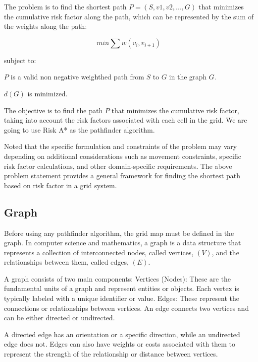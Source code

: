 \documentclass[12pt]{report}
\begin{document}
        The problem is to find the shortest path \(P = (S, v1, v2, . . . , G)\) that minimizes the cumulative risk
        factor along the path, which can be represented by the sum of the weights along the path:

        \begin{equation}\label{eq:weighted_graph}
            min \sum w(v_i,v_{i+1})
        \end{equation}

        subject to:
        \begin{myitemize}
            \item \(P\) is a valid non negative weighthed path from \(S\) to \(G\) in the graph \(G\).
            \item \(d(G)\) is minimized.           
        \end{myitemize}
        The objective is to find the path \(P\) that minimizes the cumulative risk factor, taking into account the risk
        factors associated with each cell in the grid. We are going to use Risk A* as the pathfinder algorithm.
            
            
        Noted that the specific formulation and constraints of the problem may vary depending on additional
        considerations such as movement constraints, specific risk factor calculations, and other domain-specific
        requirements. The above problem statement provides a general framework for finding the shortest path based on
        risk factor in a grid system.

        \subsection{Graph}
        Before using any pathfinder algorithm, the grid map must be defined in the graph. In computer science and
        mathematics, a graph is a data structure that represents a collection of interconnected nodes, called vertices,
        \((V)\), and the relationships between them, called edges, \((E)\).
            
        A graph consists of two main components: Vertices (Nodes): These are the fundamental units of a graph and
        represent entities or objects. Each vertex is typically labeled with a unique identifier or value. Edges: These
        represent the connections or relationships between vertices. An edge connects two vertices and can be either
        directed or undirected.
            
        A directed edge has an orientation or a specific direction, while an undirected edge does not. Edges can also
        have weights or costs associated with them to represent the strength of the relationship or distance between
        vertices.
            
\end{document}

